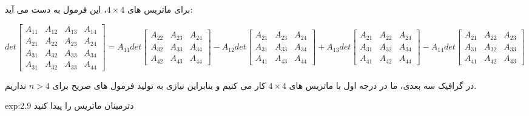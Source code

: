 {\begin{spacing}{1.5}
        برای ماتریس های $4\times 4$، این فرمول به دست می آید:

        \begin{center}
            $det\begin{bmatrix}
                    A_{11} & A_{12} & A_{13} & A_{14} \\
                    A_{21} & A_{22} & A_{23} & A_{24} \\
                    A_{31} & A_{32} & A_{33} & A_{34} \\
                    A_{31} & A_{32} & A_{33} & A_{44}
            \end{bmatrix}=A_{11}det\begin{bmatrix}
                                       A_{22} & A_{23} & A_{24} \\
                                       A_{32} & A_{33} & A_{34} \\
                                       A_{42} & A_{43} & A_{44}
            \end{bmatrix}-A_{12}det\begin{bmatrix}
                                       A_{21} & A_{23} & A_{24} \\
                                       A_{31} & A_{33} & A_{34} \\
                                       A_{41} & A_{43} & A_{44}
            \end{bmatrix}+A_{13}det\begin{bmatrix}
                                       A_{21} & A_{22} & A_{24} \\
                                       A_{31} & A_{32} & A_{34} \\
                                       A_{41} & A_{42} & A_{44}
            \end{bmatrix}-A_{14}det\begin{bmatrix}
                                       A_{21} & A_{22} & A_{23} \\
                                       A_{31} & A_{32} & A_{33} \\
                                       A_{41} & A_{42} & A_{43}
            \end{bmatrix}$
        \end{center}

        در گرافیک سه بعدی، ما در درجه اول با ماتریس های $4\times 4$ کار می کنیم و بنابراین نیازی به تولید فرمول های صریح برای $n>4$ نداریم.

        \begin{example}{exp:2.9}
            \Large
            دترمینان ماتریس را پیدا کنید


\end{example}
\end{spacing}}
